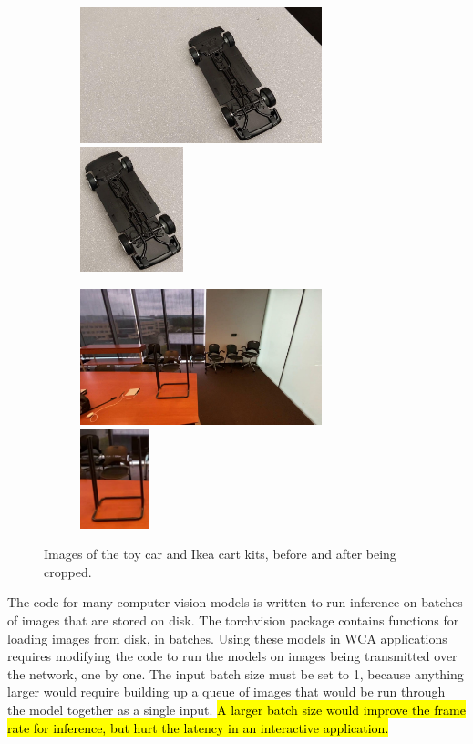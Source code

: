 \begin{figure}
  \begin{subfigure}{\textwidth}
    \includegraphics[width=7cm]{figures/two_stage/car_original.jpg}
    \includegraphics[width=3cm]{figures/two_stage/car_crop.jpg}
  \end{subfigure}
  \begin{subfigure}{\textwidth}
    \includegraphics[width=7cm]{figures/two_stage/cart_original.jpg}
    \includegraphics[width=2cm]{figures/two_stage/cart_crop.jpg}
  \end{subfigure}
  \caption{
    Images of the toy car and Ikea cart kits, before and after being cropped.
  }\label{fig:crop_examples}
\end{figure}

The code for many computer vision models is written to run inference on batches
of images that are stored on disk. The torchvision package contains functions
for loading images from disk, in batches. Using these models in WCA applications
requires modifying the code to run the models on images being transmitted over
the network, one by one. The input batch size must be set to 1, because anything
larger would require building up a queue of images that would be run through the
model together as a single input.
\hl{
A larger batch size would improve the
frame rate for inference, but hurt the latency in an interactive application.
}

